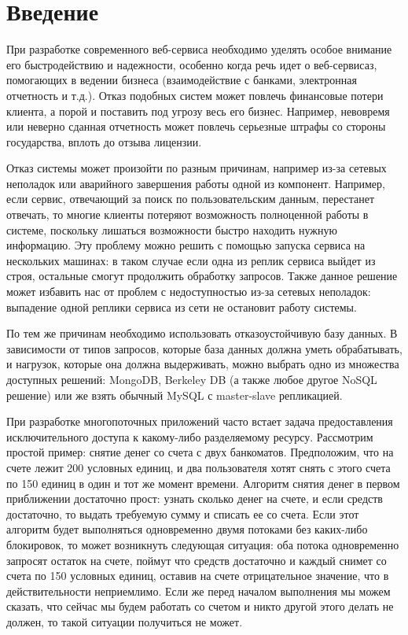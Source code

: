 \section{Введение}

При разработке современного веб-сервиса необходимо уделять особое внимание его быстродействию и надежности, особенно когда речь идет о веб-сервисаз, помогающих в ведении бизнеса (взаимодействие с банками, электронная отчетность и т.д.). Отказ подобных систем может повлечь финансовые потери клиента, а порой и поставить под угрозу весь его бизнес. Например, невовремя или неверно сданная отчетность может повлечь серьезные штрафы со стороны государства, вплоть до отзыва лицензии.

Отказ системы может произойти по разным причинам, например из-за сетевых неполадок или аварийного завершения работы одной из компонент. Например, если сервис, отвечающий за поиск по пользовательским данным, перестанет отвечать, то многие клиенты потеряют возможность полноценной работы в системе, поскольку лишаться возможности быстро находить нужную информацию. Эту проблему можно решить с помощью запуска сервиса на нескольких машинах: в таком случае если одна из реплик сервиса выйдет из строя, остальные смогут продолжить обработку запросов. Также данное решение может избавить нас от проблем с недоступностью из-за сетевых неполадок: выпадение одной реплики сервиса из сети не остановит работу системы.

По тем же причинам необходимо использовать отказоустойчивую базу данных. В зависимости от типов запросов, которые база данных должна уметь обрабатывать, и нагрузок, которые она должна выдерживать, можно выбрать одно из множества доступных решений: MongoDB, Berkeley DB (а также любое другое NoSQL решение) или же взять обычный MySQL с master-slave репликацией.

При разработке многопоточных приложений часто встает задача предоставления исключительного доступа к какому-либо разделяемому ресурсу. Рассмотрим простой пример: снятие денег со счета с двух банкоматов. Предположим, что на счете лежит 200 условных единиц, и два пользователя хотят снять с этого счета по 150 единиц в один и тот же момент времени. Алгоритм снятия денег в первом приближении достаточно прост: узнать сколько денег на счете, и если средств достаточно, то выдать требуемую сумму и списать ее со счета. Если этот алгоритм будет выполняться одновременно двумя потоками без каких-либо блокировок, то может возникнуть следующая ситуация: оба потока одновременно запросят остаток на счете, поймут что средств достаточно и каждый снимет со счета по 150 условных единиц, оставив на счете отрицательное значение, что в действительности неприемлимо. Если же перед началом выполнения мы можем сказать, что сейчас мы будем работать со счетом и никто другой этого делать не должен, то такой ситуации получиться не может.

